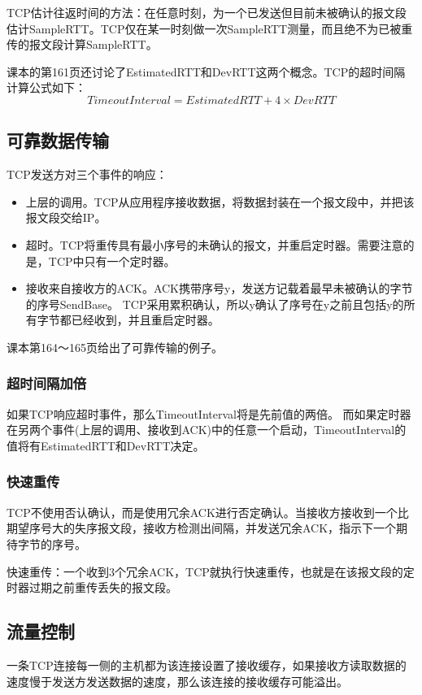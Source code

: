 \documentclass[a4paper,left=2.5cm,right=2.5cm,11pt]{article}
\begin{document}
	TCP估计往返时间的方法：在任意时刻，为一个已发送但目前未被确认的报文段估计SampleRTT。TCP仅在某一时刻做一次SampleRTT测量，而且绝不为已被重传的报文段计算SampleRTT。\par

	课本的第161页还讨论了EstimatedRTT和DevRTT这两个概念。TCP的超时间隔计算公式如下：
	\begin{equation}
		TimeoutInterval = EstimatedRTT + 4\times DevRTT
	\end{equation}

\subsection{可靠数据传输}
	TCP发送方对三个事件的响应：
	\begin{itemize}
		\item 上层的调用。TCP从应用程序接收数据，将数据封装在一个报文段中，并把该报文段交给IP。
		\item 超时。TCP将重传具有最小序号的未确认的报文，并重启定时器。需要注意的是，TCP中只有一个定时器。
		\item 接收来自接收方的ACK。ACK携带序号y，发送方记载着最早未被确认的字节的序号SendBase。
			  TCP采用累积确认，所以y确认了序号在y之前且包括y的所有字节都已经收到，并且重启定时器。
	\end{itemize}

	课本第164～165页给出了可靠传输的例子。

\subsubsection{超时间隔加倍}
	如果TCP响应超时事件，那么TimeoutInterval将是先前值的两倍。
	而如果定时器在另两个事件(上层的调用、接收到ACK)中的任意一个启动，TimeoutInterval的值将有EstimatedRTT和DevRTT决定。

\subsubsection{快速重传}
	TCP不使用否认确认，而是使用冗余ACK进行否定确认。当接收方接收到一个比期望序号大的失序报文段，接收方检测出间隔，并发送冗余ACK，指示下一个期待字节的序号。\par

	快速重传：一个收到3个冗余ACK，TCP就执行快速重传，也就是在该报文段的定时器过期之前重传丢失的报文段。

\subsection{流量控制}
	一条TCP连接每一侧的主机都为该连接设置了接收缓存，如果接收方读取数据的速度慢于发送方发送数据的速度，那么该连接的接收缓存可能溢出。\par
\end{document}
